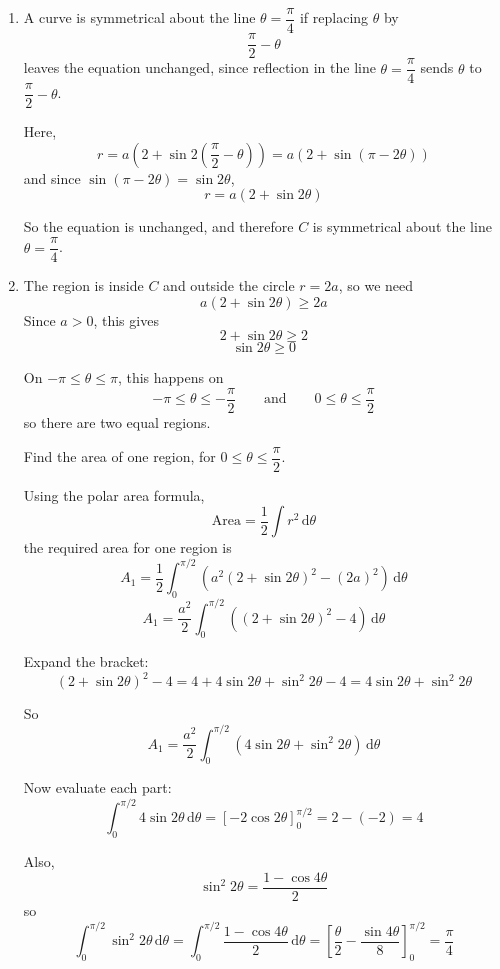 \documentclass[leqno]{article}
\begin{document}
\begin{enumerate}[
	  label=\textbf{\arabic*.},
	  leftmargin=*,
	  topsep=0pt,
	  partopsep=0pt,
	  parsep=0pt
	]
\begin{tcolorbox}[colback=white, colframe=scarlet, title={\textbf{Solution}}, breakable, grow to left by=6mm, grow to right by=10mm]
\begin{enumerate}[label=\textbf{(\alph*)}]
	  For point $B$, $\theta=0$, so
	  \[
	  r=a(2+\sin 0)=2a
	  \]
	  hence
	  \[
	  B=(2a,0)
	  \]
	
	  \item A curve is symmetrical about the line $\theta=\dfrac{\pi}{4}$ if replacing $\theta$ by
	  \[
	  \frac{\pi}{2}-\theta
	  \]
	  leaves the equation unchanged, since reflection in the line $\theta=\dfrac{\pi}{4}$ sends $\theta$ to $\dfrac{\pi}{2}-\theta$.
	
	  Here,
	  \[
	  r=a\left(2+\sin 2\left(\frac{\pi}{2}-\theta\right)\right)
	  =a\left(2+\sin(\pi-2\theta)\right)
	  \]
	  and since $\sin(\pi-2\theta)=\sin 2\theta$,
	  \[
	  r=a(2+\sin 2\theta)
	  \]
	
	  So the equation is unchanged, and therefore $C$ is symmetrical about the line $\theta=\dfrac{\pi}{4}$.
	
	  \item The region is inside $C$ and outside the circle $r=2a$, so we need
	  \[
	  a(2+\sin 2\theta)\ge 2a
	  \]
	  Since $a>0$, this gives
	  \[
	  2+\sin 2\theta \ge 2
	  \]
	  \[
	  \sin 2\theta \ge 0
	  \]
	
	  On $-\pi\le \theta \le \pi$, this happens on
	  \[
	  -\pi\le \theta \le -\frac{\pi}{2}
	  \qquad \text{and} \qquad
	  0\le \theta \le \frac{\pi}{2}
	  \]
	  so there are two equal regions.
	
	  Find the area of one region, for $0\le \theta \le \dfrac{\pi}{2}$.
	
	  Using the polar area formula,
	  \[
	  \text{Area}=\frac12\int r^2\,\mathrm{d}\theta
	  \]
	  the required area for one region is
	  \[
	  A_1=\frac12\int_0^{\pi/2}\left(a^2(2+\sin 2\theta)^2-(2a)^2\right)\,\mathrm{d}\theta
	  \]
	  \[
	  A_1=\frac{a^2}{2}\int_0^{\pi/2}\left((2+\sin 2\theta)^2-4\right)\,\mathrm{d}\theta
	  \]
	
	  Expand the bracket:
	  \[
	  (2+\sin 2\theta)^2-4
	  =4+4\sin 2\theta+\sin^2 2\theta-4
	  =4\sin 2\theta+\sin^2 2\theta
	  \]
	
	  So
	  \[
	  A_1=\frac{a^2}{2}\int_0^{\pi/2}\left(4\sin 2\theta+\sin^2 2\theta\right)\,\mathrm{d}\theta
	  \]
	
	  Now evaluate each part:
	  \[
	  \int_0^{\pi/2}4\sin 2\theta\,\mathrm{d}\theta
	  =\left[-2\cos 2\theta\right]_0^{\pi/2}
	  =2-(-2)=4
	  \]
	
	  Also,
	  \[
	  \sin^2 2\theta=\frac{1-\cos 4\theta}{2}
	  \]
	  so
	  \[
	  \int_0^{\pi/2}\sin^2 2\theta\,\mathrm{d}\theta
	  =\int_0^{\pi/2}\frac{1-\cos 4\theta}{2}\,\mathrm{d}\theta
	  =\left[\frac{\theta}{2}-\frac{\sin 4\theta}{8}\right]_0^{\pi/2}
	  =\frac{\pi}{4}
	  \]
	

\end{enumerate}
\end{tcolorbox}
\end{enumerate}
\end{document}
